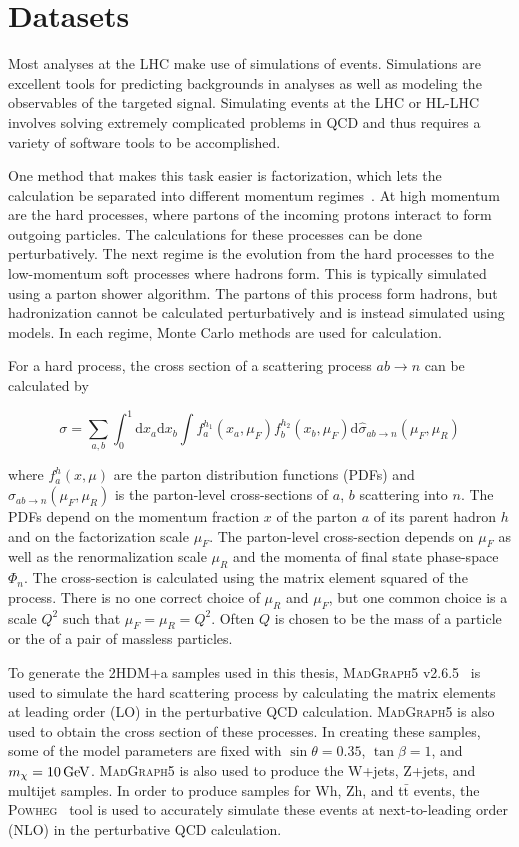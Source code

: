 \chapter{Datasets}
\label{chap:datasets}
Most analyses at the LHC make use of simulations of events. Simulations are excellent tools for predicting backgrounds in analyses as well as modeling the observables of the targeted signal. Simulating events at the LHC or HL-LHC involves solving extremely complicated problems in QCD and thus requires a variety of software tools to be accomplished.

One method that makes this task easier is factorization, which lets the calculation be separated into different momentum regimes~\cite{Buckley_2011}. At high momentum are the hard processes, where partons of the incoming protons interact to form outgoing particles. The calculations for these processes can be done perturbatively. The next regime is the evolution from the hard processes to the low-momentum soft processes where hadrons form. This is typically simulated using a parton shower algorithm. The partons of this process form hadrons, but hadronization cannot be calculated perturbatively and is instead simulated using models. In each regime, Monte Carlo methods are used for calculation.

For a hard process, the cross section of a scattering process $ab\to n$ can be calculated by

\begin{equation}
    \sigma = \sum_{a,b}\int_0^1 \mathrm{d}x_a\mathrm{d}x_b\int f^{h_1}_a(x_a, \mu_F)f^{h_2}_b(x_b, \mu_F)\mathrm{d}\hat{\sigma}_{ab\to n}(\mu_F, \mu_R)
\end{equation}

where $f^h_a(x,\mu)$ are the parton distribution functions (PDFs) and $\hat{\sigma}_{ab\to n}(\mu_F, \mu_R)$ is the parton-level cross-sections of $a$, $b$ scattering into $n$. The PDFs depend on the momentum fraction $x$ of the parton $a$ of its parent hadron $h$ and on the factorization scale $\mu_F$. The parton-level cross-section depends on $\mu_F$ as well as the renormalization scale $\mu_R$ and the momenta of final state phase-space $\Phi_n$. The cross-section is calculated using the matrix element squared of the process. There is no one correct choice of $\mu_R$ and $\mu_F$, but one common choice is a scale $Q^2$ such that $\mu_F=\mu_R=Q^2$. Often $Q$ is chosen to be the mass of a particle or the \pt of a pair of massless particles.

To generate the 2HDM+a samples used in this thesis, \textsc{MadGraph5} v2.6.5~\cite{Alwall:2014hca} is used to simulate the hard scattering process by calculating the matrix elements at leading order (LO) in the perturbative QCD calculation. \textsc{MadGraph5} is also used to obtain the cross section of these processes. In creating these samples, some of the model parameters are fixed with $\sin\theta = 0.35$, $\tan\beta = 1$, and $m_\chi = \GeV{10}$. \textsc{MadGraph5} is also used to produce the W+jets, Z+jets, and multijet samples. In order to produce samples for Wh, Zh, and t$\bar{\mathrm{t}}$ events, the \textsc{Powheg}~\cite{Frixione_2007} tool is used to accurately simulate these events at next-to-leading order (NLO) in the perturbative QCD calculation.

